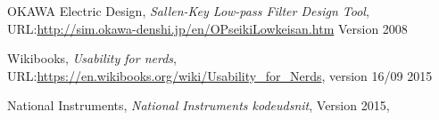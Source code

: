 \begin{thebibliography}{9}
	
	OKAWA Electric Design,
	\emph{Sallen-Key Low-pass Filter Design Tool},
	URL:\url{http://sim.okawa-denshi.jp/en/OPseikiLowkeisan.htm}
	Version 2008
	
	Wikibooks,
	\emph{Usability for nerds},
	URL:\url{https://en.wikibooks.org/wiki/Usability_for_Nerds},
	version 16/09 2015 
	
	National Instruments,
	\emph{National Instruments kodeudsnit},
	Version 2015,
	
	
	
\end{thebibliography}

